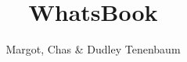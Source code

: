 \documentclass[9pt, showtrims, openany]{memoir} %
\title{WhatsBook}
\author{Margot, Chas & Dudley Tenenbaum}
\begin{document}
\begin{flushleft}
\OnehalfSpacing

\end{flushleft}
\end{document}
